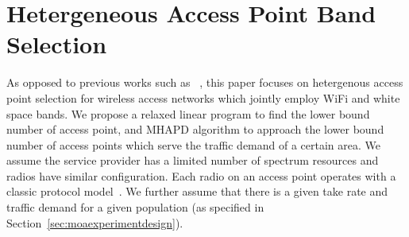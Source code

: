 



\section{Hetergeneous Access Point Band Selection}
\label{subsec:moaproblem}

As opposed to previous works such as
~\cite{franklin2007node,robinson2010deploying,si2010overview}, 
this paper focuses on hetergenous access point selection 
for wireless access networks which jointly employ WiFi and white space bands.
We propose a relaxed linear program to find the lower bound number of access point,
and MHAPD algorithm  to approach the lower bound number of access points which serve
the traffic demand of a certain area. We assume the service provider has a limited number 
of spectrum resources and radios have similar configuration. Each radio on an access 
point operates with a classic protocol model~\cite{gupta2000capacity}. 
We further assume that there is a given take rate and traffic demand for a given 
population (as specified in Section~\ref{sec:moaexperimentdesign}).

